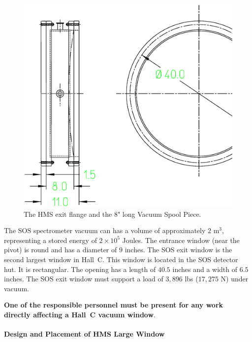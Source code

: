 {%
\begin{figure}
\includegraphics[width=6in]{figHMSflange}
\caption{The HMS exit flange and the 8" long Vacuum Spool Piece. \label{fig:hms_flange}}
\end{figure}

\begin{obsolete}
The SOS spectrometer vacuum can has a volume of approximately $2$ m$^3$,
representing a stored energy of $2 \times 10^5$ Joules. The entrance
window (near the pivot) is round and has a diameter of $9$ inches.
The SOS exit window is the second largest window in Hall~C. This
window is located in the SOS detector hut. It is rectangular.
The opening has a length of $40.5$ inches and a width of $6.5$ inches.
The SOS exit
window must support a load of $3,896$ lbs ($17,275$ N) under vacuum.
\end{obsolete}

{\bf One of the responsible personnel must be present for
any work directly affecting a Hall~C vacuum window}.

\paragraph{Design and Placement of HMS Large Window}

}
